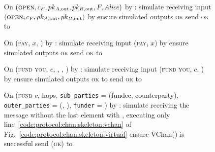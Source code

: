 \begin{figure}[H]
  \begin{simulatorbox}{\simulator}
    \begin{algorithmic}[1]
      \State On $(\textsc{open}, c_F, pk_{A, \mathrm{out}}, pk_{B,
      \mathrm{out}}, F, \mathit{Alice})$ by \fchan:
      \Indent
        \State simulate \alice receiving input $(\textsc{open}, c_F, pk_{A,
        \mathrm{out}}, pk_{B, \mathrm{out}})$ by \environment
        \State ensure simulated \alice outputs \textsc{ok}
        \State send \textsc{ok} to \fchan
      \EndIndent
      \Statex

      \State On (\textsc{pay}, $x$, \dave) by \fchan:
      \Indent
        \State simulate \dave receiving input (\textsc{pay}, $x$) by \environment
        \State ensure simulated \dave outputs \textsc{ok}
        \State send \textsc{ok} to \fchan
      \EndIndent
      \Statex

      \State On (\textsc{fund you}, $c$, \bob, \charlie, \alice) by \fchan:
      \Indent
        \State simulate \alice receiving input (\textsc{fund you}, $c$, \bob) by
        \charlie
        \State ensure simulated \alice outputs \textsc{ok} to \charlie
        \State send \textsc{ok} to \fchan
      \EndIndent
      \Statex

      \State On (\textsc{fund} $c$, hops, \texttt{sub\_parties} = (fundee,
      counterparty), \texttt{outer\_parties} = (\charlie, \dave),
      \texttt{funder} = \alice) by \fchan:
      \Indent
        \State simulate receiving the message without the last element with
        \alice, executing only line~\ref{code:protocol:chan:skeleton:vchan} of
        Fig.~\ref{code:protocol:chan:skeleton:virtual}
        \State ensure VChan() is successful
        \State send (\textsc{ok}) to \fchan
      \EndIndent
    \end{algorithmic}
  \end{simulatorbox}
  \caption{}
  \label{code:simulator}
\end{figure}
